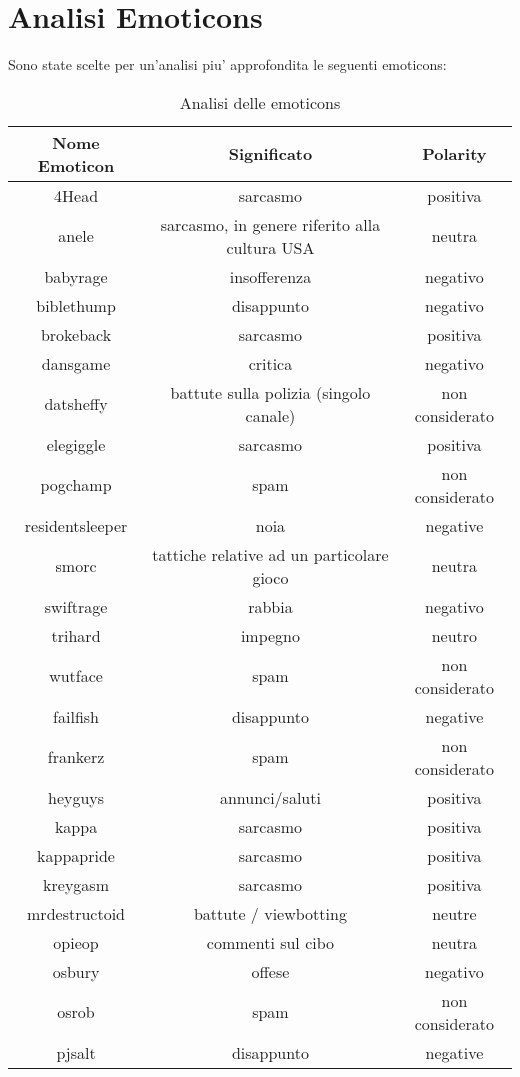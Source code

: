 \documentclass[a4paper,11pt]{book}
\theoremstyle{definition}
\begin{document}
\section{Analisi Emoticons}
Sono state scelte per un'analisi piu' approfondita le seguenti emoticons:
\begin{table}[h]
\begin{center}
\begin{tabular}{|c|c|c|}
\hline
Nome Emoticon & Significato & Polarity \\
\hline
\hline
4Head & sarcasmo & positiva \\
\hline
anele & sarcasmo, in genere riferito alla cultura USA & neutra \\
\hline
babyrage & insofferenza & negativo \\
\hline
biblethump & disappunto & negativo \\
\hline
brokeback & sarcasmo & positiva \\
\hline
dansgame & critica & negativo \\
\hline
datsheffy & battute sulla polizia (singolo canale) & non considerato \\
\hline
elegiggle & sarcasmo & positiva \\
\hline
pogchamp & spam & non considerato \\
\hline
residentsleeper & noia & negative \\
\hline
smorc & tattiche relative ad un particolare gioco & neutra \\
\hline
swiftrage & rabbia & negativo \\
\hline
trihard & impegno &  neutro \\
\hline
wutface & spam & non considerato \\
\hline
failfish & disappunto & negative \\
\hline
frankerz & spam & non considerato \\
\hline
heyguys & annunci/saluti & positiva \\
\hline
kappa & sarcasmo & positiva \\
\hline
kappapride & sarcasmo & positiva \\
\hline
kreygasm & sarcasmo & positiva \\
\hline
mrdestructoid & battute / viewbotting & neutre \\
\hline
opieop & commenti sul cibo & neutra \\
\hline
osbury & offese & negativo \\
\hline
osrob & spam & non considerato \\
\hline
pjsalt & disappunto & negative \\
\hline
\end{tabular}
\end{center}
\caption{Analisi delle emoticons}
\label{tab:emoticons1}
\end{table}
\end{document}
